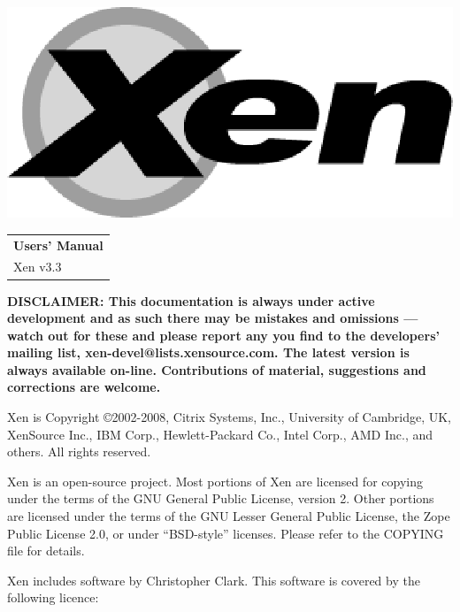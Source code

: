 \documentclass[11pt,twoside,final,openright]{report}
\begin{document}
\pagestyle{empty}
\begin{center}
\vspace*{\fill}
\includegraphics{figs/xenlogo.eps}
\vfill
\vfill
\vfill
\begin{tabular}{l}
{\Huge \bf Users' Manual} \\[4mm]
{\huge Xen v3.3} \\[80mm]
\end{tabular}
\end{center}

{\bf DISCLAIMER: This documentation is always under active development
and as such there may be mistakes and omissions --- watch out for
these and please report any you find to the developers' mailing list,
xen-devel@lists.xensource.com. The latest version is always available
on-line. Contributions of material, suggestions and corrections are
welcome.}

\vfill
\clearpage


\pagestyle{empty}

\vspace*{\fill}

Xen is Copyright \copyright  2002-2008, Citrix Systems, Inc., University of Cambridge, UK, XenSource Inc., IBM Corp., Hewlett-Packard Co., Intel Corp., AMD Inc., and others.  All rights reserved.

Xen is an open-source project.  Most portions of Xen are licensed for copying
under the terms of the GNU General Public License, version 2.  Other portions
are licensed under the terms of the GNU Lesser General Public License, the
Zope Public License 2.0, or under ``BSD-style'' licenses.  Please refer to the
COPYING file for details.

Xen includes software by Christopher Clark.  This software is covered by the
following licence:
\end{document}
